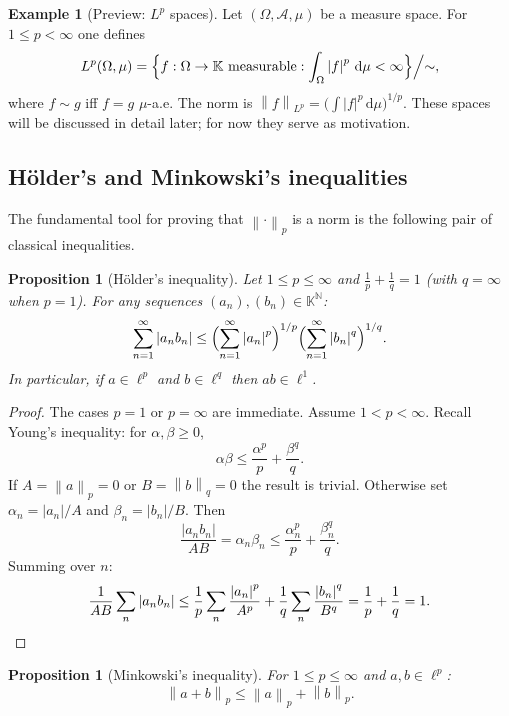 \documentclass[a4paper,12pt]{book}
\newcommand{\N}{\mathbb{N}}
\newcommand{\K}{\mathbb{K}}
\newcommand{\dd}{\mathrm{d}}
\newcommand{\norm}[1]{\left\| #1 \right\|}
\newcommand{\abs}[1]{\left| #1 \right|}
\theoremstyle{definition}
\newtheorem{example}[definition]{Example}
\theoremstyle{plain}
\newtheorem{proposition}[definition]{Proposition}
\theoremstyle{remark}
\begin{document}
\begin{example}[Preview: $L^p$ spaces]
\label{ex:Lp-preview}
Let $(\Omega,\mathcal{A},\mu)$ be a measure space.
For $1\le p<\infty$ one defines
\[
  L^p(\Omega,\mu) = \Bigl\{ f : \Omega\to\K \text{ measurable} :
                     \int_\Omega \abs{f}^p\,\dd\mu < \infty \Bigr\}\Big/{\sim},
\]
where $f\sim g$ iff $f=g$ $\mu$-a.e.  The norm is
$\norm{f}_{L^p}=\bigl(\int\abs{f}^p\,\dd\mu\bigr)^{1/p}$.  These spaces
will be discussed in detail later; for now they serve as motivation.
\end{example}

\subsection{H\"older's and Minkowski's inequalities}
\label{ssec:holder-minkowski}

The fundamental tool for proving that $\norm{\cdot}_p$ is a norm is the
following pair of classical inequalities.

\begin{proposition}[{H\"older's inequality}]
\label{prop:holder}
Let $1\le p\le\infty$ and $\frac{1}{p}+\frac{1}{q}=1$
(with $q=\infty$ when $p=1$).  For any sequences
$(a_n),(b_n)\in\K^{\N}$:
\[
  \sum_{n=1}^{\infty} \abs{a_n b_n}
  \le \Bigl(\sum_{n=1}^{\infty}\abs{a_n}^p\Bigr)^{1/p}
     \Bigl(\sum_{n=1}^{\infty}\abs{b_n}^q\Bigr)^{1/q}.
\]
In particular, if $a\in\ell^p$ and $b\in\ell^q$ then $ab\in\ell^1$.
\end{proposition}

\begin{proof}
The cases $p=1$ or $p=\infty$ are immediate.  Assume $1<p<\infty$.
Recall Young's inequality: for $\alpha,\beta\ge 0$,
\[
  \alpha\beta \le \frac{\alpha^p}{p} + \frac{\beta^q}{q}.
\]
If $A=\norm{a}_p=0$ or $B=\norm{b}_q=0$ the result is trivial.
Otherwise set $\alpha_n = \abs{a_n}/A$ and $\beta_n = \abs{b_n}/B$.  Then
\[
  \frac{\abs{a_n b_n}}{AB}
  = \alpha_n\beta_n
  \le \frac{\alpha_n^p}{p} + \frac{\beta_n^q}{q}.
\]
Summing over $n$:
\[
  \frac{1}{AB}\sum_n \abs{a_n b_n}
  \le \frac{1}{p}\sum_n\frac{\abs{a_n}^p}{A^p}
    + \frac{1}{q}\sum_n\frac{\abs{b_n}^q}{B^q}
  = \frac{1}{p}+\frac{1}{q} = 1. \qedhere
\]
\end{proof}

\begin{proposition}[{Minkowski's inequality}]
\label{prop:minkowski}
For $1\le p\le\infty$ and $a,b\in\ell^p$:
\[
  \norm{a+b}_p \le \norm{a}_p + \norm{b}_p.
\]
\end{proposition}
\end{document}
